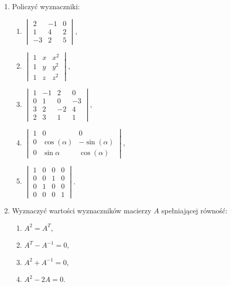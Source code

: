 \documentclass{article}
\begin{document}
\begin{enumerate}
    \item Policzyć wyznaczniki:
    \begin{enumerate}
        \item $\begin{vmatrix} 2 & -1 & 0\\ 1 & 4 & 2\\ -3 & 2 &  5 \end{vmatrix}$,
        \item $\begin{vmatrix} 1 & x & x^{2}\\ 1 & y & y^{2}\\ 1 & z & z^{2} \end{vmatrix}$,
        \item $\begin{vmatrix} 1 & -1 & 2 & 0\\ 0 & 1 & 0 & -3\\ 3 & 2 & -2 & 4\\ 2 & 3 & 1 & 1 \end{vmatrix}$,
        \item $\begin{vmatrix} 1 & 0 & 0\\ 0 & \cos(\alpha) & -\sin(\alpha)\\ 0 & \sin{\alpha} &  \cos(\alpha) \end{vmatrix}$,
        \item $\begin{vmatrix} 1 & 0 & 0 & 0\\ 0 & 0 & 1 & 0\\ 0 & 1 & 0 & 0\\ 0 & 0 & 0 & 1 \end{vmatrix}$.
    \end{enumerate}

    \item Wyznaczyć wartości wyznaczników macierzy $A$ spełniającej równość:
    \begin{enumerate}
        \item $A^{2} = A^{T}$,
        \item $A^{T} - A^{-1} = 0$,
        \item $A^{2} + A^{-1} = 0$,
        \item $A^{2} - 2A = 0$.
    \end{enumerate}


\end{enumerate}
\end{document}
